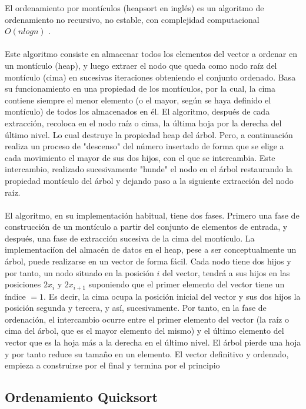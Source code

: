 \documentclass{article}
\begin{document}
El ordenamiento por mont\'iculos (heapsort en ingl\'es) es un algoritmo de ordenamiento no
recursivo, no estable, con complejidad computacional $O(n log n)$ .\\
\\
Este algoritmo consiste en almacenar todos los elementos del vector a ordenar en un
mont\'iculo (heap), y luego extraer el nodo que queda como nodo ra\'iz del mont\'iculo
(cima) en sucesivas iteraciones obteniendo el conjunto ordenado. Basa su funcionamiento en
una propiedad de los mont\'iculos, por la cual, la cima contiene siempre el menor elemento
(o el mayor, seg\'un se haya definido el mont\'iculo) de todos los almacenados en \'el.
El algoritmo, despu\'es de cada extracci\'on, recoloca en el nodo ra\'iz o cima, la \'ultima
hoja por la derecha del \'ultimo nivel. Lo cual destruye la propiedad heap del \'arbol.
Pero, a continuaci\'on realiza un proceso de "descenso" del n\'umero insertado de forma
que se elige a cada movimiento el mayor de sus dos hijos, con el que se intercambia.
Este intercambio, realizado sucesivamente "hunde" el nodo en el \'arbol restaurando la
propiedad mont\'iculo del \'arbol y dejando paso a la siguiente extracci\'on del nodo ra\'iz.\\
\\
El algoritmo, en su implementaci\'on habitual, tiene dos fases. Primero una fase de
construcci\'on de un mont\'iculo a partir del conjunto de elementos de entrada, y
despu\'es, una fase de extracci\'on sucesiva de la cima del mont\'iculo.
La implementaci\'ion del almac\'en de datos en el heap, pese a ser conceptualmente un
 \'arbol, puede realizarse en un vector de forma f\'acil. Cada nodo tiene dos hijos y por
tanto, un nodo situado en la posici\'on $i$ del vector, tendr\'a a sus hijos en las
posiciones $2 x_i$ y $2 x_{i +1}$ suponiendo que el primer elemento del vector tiene un
\'indice $= 1$. Es decir, la cima ocupa la posici\'on inicial del vector y sus dos hijos
la posici\'on segunda y tercera, y as\'i, sucesivamente. Por tanto, en la fase de
ordenaci\'on, el intercambio ocurre entre el primer elemento del vector (la ra\'iz o cima
del \'arbol, que es el mayor elemento del mismo) y el \'ultimo elemento del vector que es
la hoja m\'as a la derecha en el \'ultimo nivel. El \'arbol pierde una hoja y por tanto
reduce su tama\~{n}o en un elemento. El vector definitivo y ordenado, empieza a
construirse por el final y termina por el principio

\subsection*{Ordenamiento Quicksort}
\end{document}
